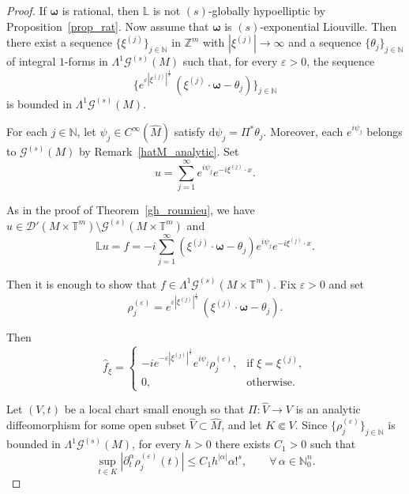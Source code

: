 \documentclass[11pt,reqno]{amsart}
\numberwithin{equation}{section}
\begin{document}
	\begin{proof}
		If \(\boldsymbol{\omega}\) is rational, then \(\mathbb{L}\) is not \((s)\)-globally hypoelliptic by Proposition~\ref{prop_rat}.
		Now assume that \(\boldsymbol{\omega}\) is \((s)\)-exponential Liouville.
		Then there exist a sequence \(\{\xi^{(j)}\}_{j\in\mathbb{N}}\) in \(\mathbb{Z}^m\) with \(|\xi^{(j)}|\to\infty\) and a sequence \(\{\theta_j\}_{j\in\mathbb{N}}\) of integral \(1\)-forms in \(\mathsf{\Lambda}^1\mathscr{G}^{(s)}(M)\) such that, for every \(\varepsilon>0\), the sequence
		\[
		\bigl\{e^{\varepsilon|\xi^{(j)}|^{\frac{1}{s}}}\,(\xi^{(j)}\cdot\boldsymbol{\omega}-\theta_j)\bigr\}_{j\in\mathbb{N}}
		\]
		is bounded in \(\mathsf{\Lambda}^1\mathscr{G}^{(s)}(M)\).
		
		For each \(j\in\mathbb{N}\), let \(\psi_j\in C^\infty(\hat M)\) satisfy \(\mathrm{d}\psi_j=\Pi^*\theta_j\).
		Moreover, each \(e^{i\psi_j}\) belongs to \(\mathscr{G}^{(s)}(M)\) by Remark~\ref{hatM_analytic}.
		Set
		\[
		u=\sum_{j=1}^{\infty} e^{i\psi_j}e^{-i\xi^{(j)}\cdot x}.
		\]
		
		As in the proof of Theorem~\ref{gh_roumieu}, we have
		\(u\in \mathscr{D}' (M\times\mathbb{T}^m) \setminus \mathscr{G}^{(s)} (M\times\mathbb{T}^m) \) and
		\[
		\mathbb{L}u=f=-i\sum_{j=1}^\infty (\xi^{(j)}\cdot\boldsymbol{\omega}-\theta_j)e^{i\psi_j}e^{-i\xi^{(j)}\cdot x}.
		\]

		Then it is enough to show that \(f\in\mathsf{\Lambda}^1\mathscr{G}^{(s)}(M\times\mathbb{T}^m)\).
		Fix \(\varepsilon>0\) and set
		\[
		\rho_j^{(\varepsilon)} = e^{\varepsilon|\xi^{(j)}|^{\frac{1}{s}}}\,(\xi^{(j)}\cdot\boldsymbol{\omega}-\theta_j).
		\]
		
		Then
		\[
		\widehat{f}_\xi =
		\begin{cases}
			-ie^{-\varepsilon|\xi^{(j)}|^{\frac{1}{s}}}e^{i\psi_j}\rho_j^{(\varepsilon)}, & \text{if } \xi=\xi^{(j)},\\
			0, & \text{otherwise}.
		\end{cases}
		\]
		
		Let \((V,t)\) be a local chart small enough so that \(\Pi:\hat V\to V\) is an analytic diffeomorphism for some open subset \(\hat V\subset\hat M\),
		and let \(K\Subset V\).
		Since \(\{\rho_j^{(\varepsilon)}\}_{j\in\mathbb{N}}\) is bounded in \(\mathsf{\Lambda}^1\mathscr{G}^{(s)}(M)\), for every \(h>0\) there exists \(C_1>0\) such that
		\begin{equation}\label{est_rhoj_b}
			\sup_{t\in K}|\partial_t^\alpha\rho_j^{(\varepsilon)}(t)|
			\leq C_1h^{|\alpha|}\alpha!^s,
			\qquad \forall\, \alpha\in\mathbb{N}_0^n.
		\end{equation}
		

\end{proof}
\end{document}

